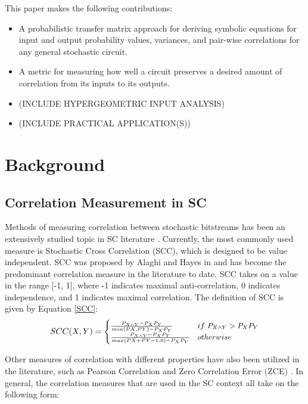\documentclass[conference]{IEEEtran}
\begin{document}
This paper makes the following contributions:
\begin{itemize}
    \item A probabilistic transfer matrix approach for deriving symbolic equations for input and output probability values, variances, and pair-wise correlations for any general stochastic circuit.
    \item A metric for measuring how well a circuit preserves a desired amount of correlation from its inputs to its outputs.
    \item (INCLUDE HYPERGEOMETRIC INPUT ANALYSIS)
    \item (INCLUDE PRACTICAL APPLICATION(S))
\end{itemize}

\section{Background}
\subsection{Correlation Measurement in SC}
Methods of measuring correlation between stochastic bitstreams has been an extensively studied topic in SC literature \cite{EXPLOITING_CORR}. Currently, the most commonly used measure is Stochastic Cross Correlation (SCC), which is designed to be value independent. SCC was proposed by Alaghi and Hayes in \cite{EXPLOITING_CORR} and has become the predominant correlation measure in the literature to date. SCC takes on a value in the range [-1, 1], where -1 indicates maximal anti-correlation, 0 indicates independence, and 1 indicates maximal correlation. The definition of SCC is given by Equation \ref{SCC}:
\begin{equation}\label{SCC}\small
    SCC(X,Y) =
    \begin{cases}
        \frac{P_{X \land Y} - P_XP_Y}{min(PX,PY)-P_XP_Y} & if \ P_{X \land Y} > P_XP_Y \\
        \frac{P_{X \land Y} - P_XP_Y}{max(PX+PY-1, 0)-P_XP_Y} & otherwise
    \end{cases}
\end{equation}
\normalsize

Other measures of correlation with different properties have also been utilized in the literature, such as Pearson Correlation \cite{RIEDEL_BIT_CORR} and Zero Correlation Error (ZCE) \cite{ZCE}. In general, the correlation measures that are used in the SC context all take on the following form:
\end{document}

